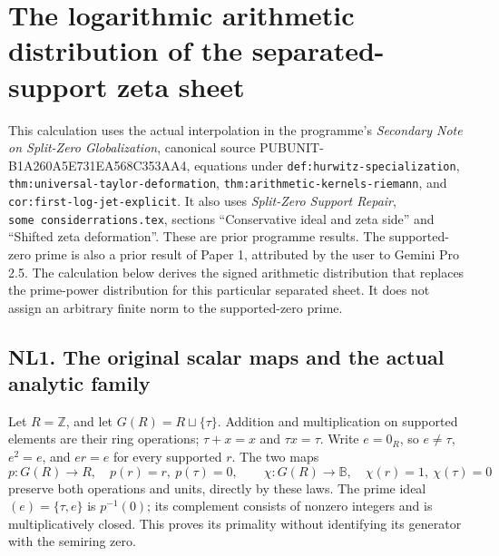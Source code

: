 \documentclass[
  10pt,
  a4paper,
]{article}
\author{}
\date{}
\begin{document}
{
\setcounter{tocdepth}{3}
\tableofcontents
}
\section{The logarithmic arithmetic distribution of the
separated-support zeta
sheet}\label{the-logarithmic-arithmetic-distribution-of-the-separated-support-zeta-sheet}

This calculation uses the actual interpolation in the programme's
\emph{Secondary Note on Split-Zero Globalization}, canonical source
PUBUNIT-B1A260A5E731EA568C353AA4, equations under
\texttt{def:\allowbreak{}hurwitz-\allowbreak{}specialization},
\texttt{thm:\allowbreak{}universal-\allowbreak{}taylor-\allowbreak{}deformation},
\texttt{thm:\allowbreak{}arithmetic-\allowbreak{}kernels-\allowbreak{}riemann}, and
\texttt{cor:\allowbreak{}first-\allowbreak{}log-\allowbreak{}jet-\allowbreak{}explicit}. It also uses \emph{Split-Zero
Support Repair}, \texttt{some\ considerrations.\allowbreak{}tex}, sections
``Conservative ideal and zeta side'' and ``Shifted zeta deformation''.
These are prior programme results. The supported-zero prime is also a
prior result of Paper 1, attributed by the user to Gemini Pro 2.5. The
calculation below derives the signed arithmetic distribution that
replaces the prime-power distribution for this particular separated
sheet. It does not assign an arbitrary finite norm to the supported-zero
prime.

\subsection{NL1. The original scalar maps and the actual analytic
family}\label{nl1.-the-original-scalar-maps-and-the-actual-analytic-family}

Let \(R=\mathbb Z\), and let \(G(R)=R\sqcup\{\tau\}\). Addition and
multiplication on supported elements are their ring operations;
\(\tau+x=x\) and \(\tau x=\tau\). Write \(e=0_R\), so \(e\ne\tau\),
\(e^2=e\), and \(er=e\) for every supported \(r\). The two maps \[
p:G(R)\to R,\quad p(r)=r,\ p(\tau)=0,
\qquad
\chi:G(R)\to\mathbb B,\quad \chi(r)=1,\ \chi(\tau)=0
\tag{NL1}
\] preserve both operations and units, directly by these laws. The prime
ideal \((e)=\{\tau,e\}\) is \(p^{-1}(0)\); its complement consists of
nonzero integers and is multiplicatively closed. This proves its
primality without identifying its generator with the semiring zero.
\end{document}
